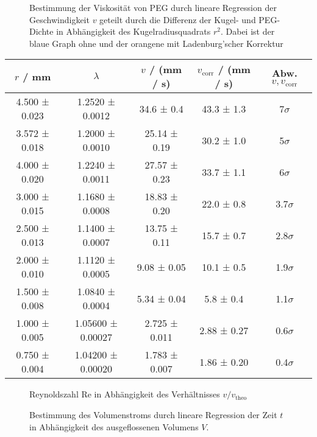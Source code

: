 \documentclass[12pt,a4paper,german]{scrartcl}
\begin{document}
  \begin{figure}[h]
    \centering
    \resizebox{\textwidth}{!}{
      
    }
    \caption{Bestimmung der Viskosität von PEG durch lineare Regression der Geschwindigkeit $v$ geteilt durch die Differenz der Kugel- und PEG-Dichte in Abhängigkeit des Kugelradiusquadrats $r^2$. Dabei ist der blaue Graph ohne und der orangene mit Ladenburg'scher Korrektur}
    \label{fig_stokes_viscosity_regression}
  \end{figure}

  \begin{center}
    \begin{tabular}{c|c|c|c|c}
      $r$ / mm & $\lambda$ & $v$ / (mm / s) & $v_\text{corr}$ / (mm / s) & Abw. $v, v_\text{corr}$ \\
      \hline
      4.500 ± 0.023 &  1.2520 ± 0.0012  &  34.6 ± 0.4   &   43.3 ± 1.3    &     7$\sigma$ \\
      3.572 ± 0.018 &  1.2000 ± 0.0010  & 25.14 ± 0.19  &   30.2 ± 1.0    &     5$\sigma$ \\
      4.000 ± 0.020 &  1.2240 ± 0.0011  & 27.57 ± 0.23  &   33.7 ± 1.1    &     6$\sigma$ \\
      3.000 ± 0.015 &  1.1680 ± 0.0008  & 18.83 ± 0.20  &   22.0 ± 0.8    &   3.7$\sigma$ \\
      2.500 ± 0.013 &  1.1400 ± 0.0007  & 13.75 ± 0.11  &   15.7 ± 0.7    &   2.8$\sigma$ \\
      2.000 ± 0.010 &  1.1120 ± 0.0005  &  9.08 ± 0.05  &   10.1 ± 0.5    &   1.9$\sigma$ \\
      1.500 ± 0.008 &  1.0840 ± 0.0004  &  5.34 ± 0.04  &    5.8 ± 0.4    &   1.1$\sigma$ \\
      1.000 ± 0.005 & 1.05600 ± 0.00027 & 2.725 ± 0.011 &   2.88 ± 0.27   &   0.6$\sigma$ \\
      0.750 ± 0.004 & 1.04200 ± 0.00020 & 1.783 ± 0.007 &   1.86 ± 0.20   &   0.4$\sigma$
    \end{tabular}
    \label{table_v_correction}
  \end{center}

  \begin{figure}[h]
    \centering
    \resizebox{\textwidth}{!}{
      
    }
    \caption{Reynoldszahl Re in Abhängigkeit des Verhältnisses $v / v_\text{theo}$}
    \label{fig_reynolds}
  \end{figure}

  \begin{figure}[h]
    \centering
    \resizebox{\textwidth}{!}{
      
    }
    \caption{Bestimmung des Volumenstroms durch lineare Regression der Zeit $t$ in Abhängigkeit des ausgeflossenen Volumens $V$.}
    \label{fig_hp_volume_flow}
  \end{figure}
\end{document}
